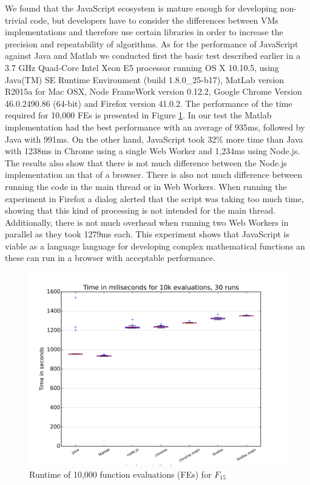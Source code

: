 \documentclass[journal,onecolumn]{IEEEtran}
\begin{document}
We found that the JavaScript ecosystem is mature enough for developing non-trivial 
code, but developers have to consider the differences between VMs implementations
and therefore use certain libraries in order to increase the precision and repeatability of
algorithms. As for the performance of JavaScript against Java and Matlab
we conducted first the basic test described earlier in a 3.7 GHz Quad-Core
Intel Xeon E5 processor running OS X 10.10.5, 
using Java(TM) SE Runtime Environment (build 1.8.0\_25-b17), 
MatLab version R2015a for Mac OSX, Node FrameWork version 0.12.2,
Google Chrome Version 46.0.2490.86 (64-bit) 
and Firefox version 41.0.2. %
 The performance of the time required for 10,000 FEs is presented in
Figure \ref{fig:f15_times}. In our test the Matlab implementation had the best
performance with an average of 935ms, followed by Java with
991ms. On the other hand, JavaScript took 32\% more time than Java with 1238ms in Chrome using a 
single Web Worker and 1,234ms using Node.js. %
The results also show that there is not much difference between the Node.js
implementation an that of a
browser. There is also not much difference between running the code in the main thread or in Web
Workers. When running the experiment in Firefox a dialog alerted that the
script was taking too much time, showing that this
kind of processing is not intended for the main thread. Additionally, there is not much overhead
when running two
Web Workers in parallel as they took 1279ms each. This experiment
shows that JavaScript is viable as a language
language for developing complex mathematical functions an these can run in a browser
with acceptable performance. 
\begin{figure}[!htb]
\centering
\includegraphics[width=0.9\linewidth]{f15_times.png}
\caption{ Runtime of 10,000 function evaluations (FEs) for $F_{15}$} 
\label{fig:f15_times}
\end{figure}
\end{document}

